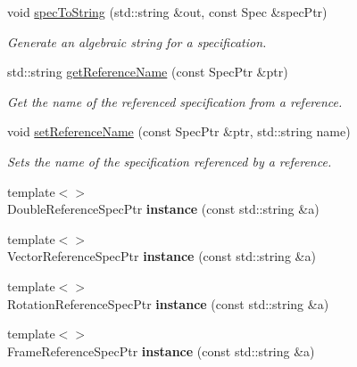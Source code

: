 \begin{DoxyCompactItemize}
void \hyperlink{namespacegiskard__suturo_abb49bf0a96cc85919b1492b365485bb6}{spec\-To\-String} (std\-::string \&out, const Spec \&spec\-Ptr)
\begin{DoxyCompactList}\small\item\em Generate an algebraic string for a specification. \end{DoxyCompactList}\item 
std\-::string \hyperlink{namespacegiskard__suturo_ac29c336e51726f1c52adf165c6d346df}{get\-Reference\-Name} (const Spec\-Ptr \&ptr)
\begin{DoxyCompactList}\small\item\em Get the name of the referenced specification from a reference. \end{DoxyCompactList}\item 
void \hyperlink{namespacegiskard__suturo_a30289fe537d28600a3c0cf49324c5666}{set\-Reference\-Name} (const Spec\-Ptr \&ptr, std\-::string name)
\begin{DoxyCompactList}\small\item\em Sets the name of the specification referenced by a reference. \end{DoxyCompactList}\item 
\hypertarget{namespacegiskard__suturo_abe3d96400b599235b17cc2845eeae434}{{\footnotesize template$<$$>$ }\\Double\-Reference\-Spec\-Ptr {\bfseries instance} (const std\-::string \&a)}\label{namespacegiskard__suturo_abe3d96400b599235b17cc2845eeae434}

\item 
\hypertarget{namespacegiskard__suturo_a4ea7cf689a6ba9590b835aab29a4ea21}{{\footnotesize template$<$$>$ }\\Vector\-Reference\-Spec\-Ptr {\bfseries instance} (const std\-::string \&a)}\label{namespacegiskard__suturo_a4ea7cf689a6ba9590b835aab29a4ea21}

\item 
\hypertarget{namespacegiskard__suturo_af8ce2cfcb192ba94c4570745e94d00b5}{{\footnotesize template$<$$>$ }\\Rotation\-Reference\-Spec\-Ptr {\bfseries instance} (const std\-::string \&a)}\label{namespacegiskard__suturo_af8ce2cfcb192ba94c4570745e94d00b5}

\item 
\hypertarget{namespacegiskard__suturo_a06877e01d3f11c15b4ac8a775f641b01}{{\footnotesize template$<$$>$ }\\Frame\-Reference\-Spec\-Ptr {\bfseries instance} (const std\-::string \&a)}\label{namespacegiskard__suturo_a06877e01d3f11c15b4ac8a775f641b01}


\end{DoxyCompactItemize}
